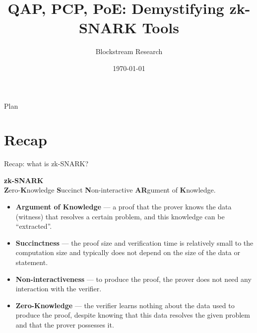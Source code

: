 \documentclass{zkdl-presentation-template}
\title[QAP and PCP]{\textbf{QAP, PCP, PoE: Demystifying zk-SNARK Tools}}
\author{Blockstream Research}
\date{\today}
\begin{document}
    \maketitleframe

    \begin{frame}{Plan}
        \tableofcontents
    \end{frame}

    \section{Recap}

    \begin{frame}{Recap: what is zk-SNARK?}
        \begin{definition}
            \begin{center}
                \textbf{zk-SNARK} \\
                \textbf{Z}ero-\textbf{K}nowledge \textbf{S}uccinct \textbf{N}on-interactive \textbf{AR}gument of \textbf{K}nowledge.
            \end{center}
        \end{definition}
        \pause

        \begin{itemize}[label=]
            \item \textbf{Argument of Knowledge} --- a proof that the prover knows the data (witness) that resolves a certain
            problem, and this knowledge can be ``extracted''. \pause
            \item \textbf{Succinctness} --- the proof size and verification time is relatively small to the computation size and typically does not depend on the size of
            the data or statement. \pause
            \item \textbf{Non-interactiveness} --- to produce the proof, the prover does not need any interaction
            with the verifier. \pause
            \item \textbf{Zero-Knowledge} --- the verifier learns nothing about the data used to produce the
            proof, despite knowing that this data resolves the given problem and that the prover possesses it.
        \end{itemize}
    \end{frame}
\end{document}
